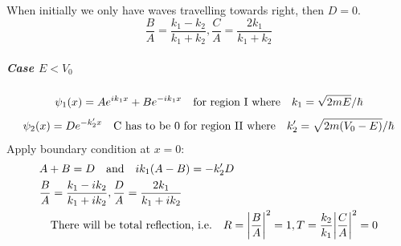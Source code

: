 \documentclass[a4paper,10pt]{article}
\begin{document}
When initially we only have waves travelling towards right, then $D=0$.
$$\frac{B}{A}=\frac{k_1-k_2}{k_1+k_2},\frac{C}{A}=\frac{2k_1}{k_1+k_2}$$
\subparagraph{Case $E<V_0$}
$$\psi_1(x)=Ae^{ik_1x}+Be^{-ik_1x}\qq{for region I where}k_1=\sqrt{2mE}/\hbar$$
$$\psi_2(x)=De^{-k_2^\prime x}\qq{C has to be 0 for region II where}k_2^\prime=\sqrt{2m(V_0-E)}/\hbar$$
Apply boundary condition at $x=0$:
\begin{align*}
     & A+B=D\qq{and}ik_1(A-B)=-k_2^\prime D                                                                    \\
     & \frac{B}{A}=\frac{k_1-ik_2}{k_1+ik_2},\frac{D}{A}=\frac{2k_1}{k_1+ik_2}                                 \\
     & \qq{There will be total reflection, i.e.}R=\abs{\frac{B}{A}}^2=1,T=\frac{k_2}{k_1}\abs{\frac{C}{A}}^2=0
\end{align*}
\end{document}
